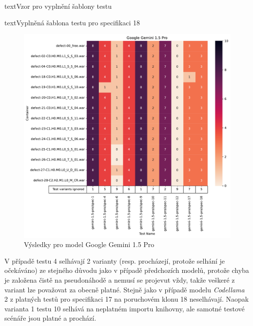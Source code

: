 \documentclass[czech, ma, kiv, he, iso690numb, pdf, viewonly]{fasthesis}
\begin{document}
\begin{code}{text}{Vzor pro vyplnění šablony testu \label{lst:template}}
{\begin{code}{text}{Vyplněná šablona testu pro specifikaci 18 \label{lst:spec18}}
{            \begin{figure}
                \includegraphics[width=\textwidth]{pic/gemini-results.pdf}
                \caption{Výsledky pro model Google Gemini 1.5 Pro}
                \label{fig:res:gemini}
            \end{figure}

            V případě testu 4 selhávají 2 varianty (resp. procházejí, protože selhání je očekáváno) ze stejného důvodu jako v případě předchozích modelů, protože chyba je založena čistě na pseudonáhodě a nemusí se projevut vždy, takže veškeré z variant lze považovat za obecně platné. Stejně jako v případě modelu \textit{Codellama} 2 z platných testů pro specifikaci 17 na poruchovém klonu 18 neselhávají. Naopak varianta 1 testu 10 selhává na neplatném importu knihovny, ale samotné testové scénáře jsou platné a prochází.
            

}
\end{code}}
\end{code}
\end{document}

